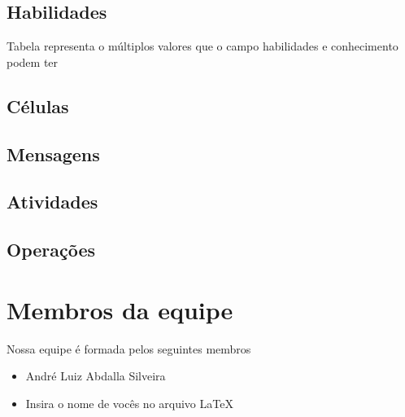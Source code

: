 \documentclass[11pt]{article}
\begin{document}
        \subsection{Habilidades}

            Tabela representa o múltiplos valores que o campo habilidades e conhecimento podem ter

        \subsection{Células}
        \subsection{Mensagens}
        \subsection{Atividades}
        \subsection{Operações}

    \section[Equipe]{Membros da equipe}

    Nossa equipe é formada pelos seguintes membros
    \begin{itemize}
        \item André Luiz Abdalla Silveira
        \item Insira o nome de vocês no arquivo \LaTeX
    \end{itemize}
\end{document}
